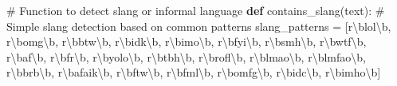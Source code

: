 \documentclass[
  12pt,
  letterpaper,
  DIV=11,
  numbers=noendperiod]{scrartcl}
\newenvironment{Shaded}{\begin{snugshade}}{\end{snugshade}}
\newcommand{\CommentTok}[1]{\textcolor[rgb]{0.37,0.37,0.37}{#1}}
\newcommand{\KeywordTok}[1]{\textcolor[rgb]{0.00,0.23,0.31}{\textbf{#1}}}
\newcommand{\NormalTok}[1]{\textcolor[rgb]{0.00,0.23,0.31}{#1}}
\newcommand{\OperatorTok}[1]{\textcolor[rgb]{0.37,0.37,0.37}{#1}}
\newcommand{\VerbatimStringTok}[1]{\textcolor[rgb]{0.13,0.47,0.30}{#1}}
\begin{document}
\begin{Shaded}
\begin{Highlighting}[]
\CommentTok{\# Function to detect slang or informal language}
\KeywordTok{def}\NormalTok{ contains\_slang(text):}
    \CommentTok{\# Simple slang detection based on common patterns}
\NormalTok{    slang\_patterns }\OperatorTok{=}\NormalTok{ [}\VerbatimStringTok{r\textquotesingle{}\textbackslash{}blol\textbackslash{}b\textquotesingle{}}\NormalTok{, }\VerbatimStringTok{r\textquotesingle{}\textbackslash{}bomg\textbackslash{}b\textquotesingle{}}\NormalTok{, }\VerbatimStringTok{r\textquotesingle{}\textbackslash{}bbtw\textbackslash{}b\textquotesingle{}}\NormalTok{, }\VerbatimStringTok{r\textquotesingle{}\textbackslash{}bidk\textbackslash{}b\textquotesingle{}}\NormalTok{, }\VerbatimStringTok{r\textquotesingle{}\textbackslash{}bimo\textbackslash{}b\textquotesingle{}}\NormalTok{, }\VerbatimStringTok{r\textquotesingle{}\textbackslash{}bfyi\textbackslash{}b\textquotesingle{}}\NormalTok{, }
                      \VerbatimStringTok{r\textquotesingle{}\textbackslash{}bsmh\textbackslash{}b\textquotesingle{}}\NormalTok{, }\VerbatimStringTok{r\textquotesingle{}\textbackslash{}bwtf\textbackslash{}b\textquotesingle{}}\NormalTok{, }\VerbatimStringTok{r\textquotesingle{}\textbackslash{}baf\textbackslash{}b\textquotesingle{}}\NormalTok{, }\VerbatimStringTok{r\textquotesingle{}\textbackslash{}bfr\textbackslash{}b\textquotesingle{}}\NormalTok{, }\VerbatimStringTok{r\textquotesingle{}\textbackslash{}byolo\textbackslash{}b\textquotesingle{}}\NormalTok{, }\VerbatimStringTok{r\textquotesingle{}\textbackslash{}btbh\textbackslash{}b\textquotesingle{}}\NormalTok{,}
                      \VerbatimStringTok{r\textquotesingle{}\textbackslash{}brofl\textbackslash{}b\textquotesingle{}}\NormalTok{, }\VerbatimStringTok{r\textquotesingle{}\textbackslash{}blmao\textbackslash{}b\textquotesingle{}}\NormalTok{, }\VerbatimStringTok{r\textquotesingle{}\textbackslash{}blmfao\textbackslash{}b\textquotesingle{}}\NormalTok{, }\VerbatimStringTok{r\textquotesingle{}\textbackslash{}bbrb\textbackslash{}b\textquotesingle{}}\NormalTok{, }\VerbatimStringTok{r\textquotesingle{}\textbackslash{}bafaik\textbackslash{}b\textquotesingle{}}\NormalTok{,}
                      \VerbatimStringTok{r\textquotesingle{}\textbackslash{}bftw\textbackslash{}b\textquotesingle{}}\NormalTok{, }\VerbatimStringTok{r\textquotesingle{}\textbackslash{}bfml\textbackslash{}b\textquotesingle{}}\NormalTok{, }\VerbatimStringTok{r\textquotesingle{}\textbackslash{}bomfg\textbackslash{}b\textquotesingle{}}\NormalTok{, }\VerbatimStringTok{r\textquotesingle{}\textbackslash{}bidc\textbackslash{}b\textquotesingle{}}\NormalTok{, }\VerbatimStringTok{r\textquotesingle{}\textbackslash{}bimho\textbackslash{}b\textquotesingle{}}\NormalTok{]}
    

\end{Highlighting}
\end{Shaded}
\end{document}
